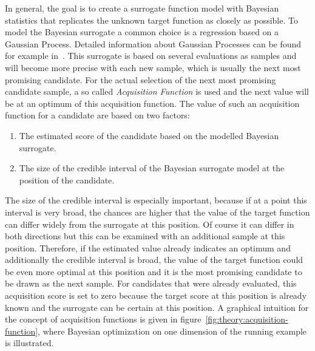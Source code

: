 In general, the goal is to create a surrogate function model with Bayesian statistics that replicates the unknown target function as closely as possible.
To model the Bayesian surrogate a common choice is a regression based on a Gaussian Process.
Detailed information about Gaussian Processes can be found for example in~\cite{Rasmussen-Gaussian-Processes}.\newline
This surrogate is based on several evaluations as samples and will become more precise with each new sample, which is usually the next most promising candidate.
For the actual selection of the next most promising candidate sample, a so called \textit{Acquisition Function} is used and the next value will be at an optimum of this acquisition function.
The value of such an acquisition function for a candidate are based on two factors:
\begin{enumerate}
    \item The estimated score of the candidate based on the modelled Bayesian surrogate.
    \item The size of the credible interval of the Bayesian surrogate model at the position of the candidate.
\end{enumerate}
The size of the credible interval is especially important, because if at a point this interval is very broad, the chances are higher that the value of the target function can differ widely from the surrogate at this position.
Of course it can differ in both directions but this can be examined with an additional sample at this position.
Therefore, if the estimated value already indicates an optimum and additionally the credible interval is broad, the value of the target function could be even more optimal at this position and it is the most promising candidate to be drawn as the next sample.
For candidates that were already evaluated, this acquisition score is set to zero because the target score at this position is already known and the surrogate can be certain at this position.
A graphical intuition for the concept of acquisition functions is given in figure~\ref{fig:theory:acquisition-function}, where Bayesian optimization on one dimension of the running example is illustrated.
